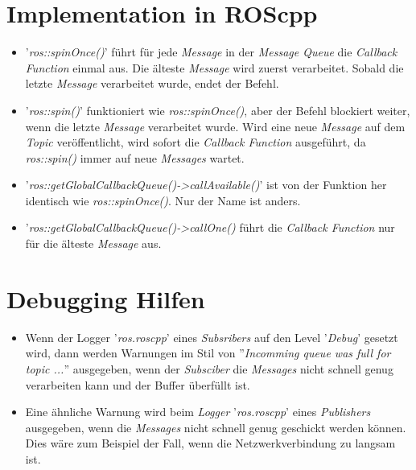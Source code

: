 \section{Implementation in ROScpp}
\begin{itemize}
\item '\textit{ros::spinOnce()}' führt für jede \textit{Message} in der \textit{Message Queue} die \textit{Callback Function} einmal aus. Die älteste \textit{Message} wird zuerst verarbeitet. Sobald die letzte \textit{Message} verarbeitet wurde, endet der Befehl.
\item '\textit{ros::spin()}' funktioniert wie \textit{ros::spinOnce()}, aber der Befehl blockiert weiter, wenn die letzte \textit{Message} verarbeitet wurde. Wird eine neue \textit{Message} auf dem \textit{Topic} veröffentlicht, wird sofort die \textit{Callback Function} ausgeführt, da \textit{ros::spin()} immer auf neue \textit{Messages} wartet.
\item '\textit{ros::getGlobalCallbackQueue()->callAvailable()}' ist von der Funktion her identisch wie \textit{ros::spinOnce()}. Nur der Name ist anders.
\item '\textit{ros::getGlobalCallbackQueue()->callOne()} führt die \textit{Callback Function} nur für die älteste \textit{Message} aus.
\end{itemize}


\section{Debugging Hilfen}
\begin{itemize}
\item Wenn der Logger '\textit{ros.roscpp}' eines \textit{Subsribers} auf den Level '\textit{Debug}' gesetzt wird, dann werden Warnungen im Stil von ''\textit{Incomming queue was full for topic ...}'' ausgegeben, wenn der \textit{Subsciber} die \textit{Messages} nicht schnell genug verarbeiten kann und der Buffer überfüllt ist.
\item Eine ähnliche Warnung wird beim \textit{Logger} '\textit{ros.roscpp}' eines \textit{Publishers} ausgegeben, wenn die \textit{Messages} nicht schnell genug geschickt werden können. Dies wäre zum Beispiel der Fall, wenn die Netzwerkverbindung zu langsam ist.
\end{itemize}